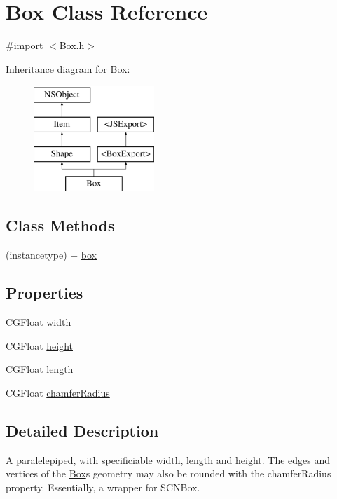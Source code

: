\hypertarget{interface_box}{}\section{Box Class Reference}
\label{interface_box}


{\ttfamily \#import $<$Box.\+h$>$}

Inheritance diagram for Box\+:\begin{figure}[H]
\begin{center}
\leavevmode
\includegraphics[height=4.000000cm]{interface_box}
\end{center}
\end{figure}
\subsection*{Class Methods}
\begin{DoxyCompactItemize}
\item 
(instancetype) + \hyperlink{interface_box_aa58179158dc10ea7967081d61214b681}{box}
\end{DoxyCompactItemize}
\subsection*{Properties}
\begin{DoxyCompactItemize}
\item 
C\+G\+Float \hyperlink{interface_box_afc93a48f771956f78dbd30a81e04d295}{width}
\item 
C\+G\+Float \hyperlink{interface_box_a638a76c342fdc0b592e679d800b6fd06}{height}
\item 
C\+G\+Float \hyperlink{interface_box_a2c7eae6cda0de5f55b0b25fce41d12c5}{length}
\item 
C\+G\+Float \hyperlink{interface_box_a8804e085ce16dbee90cc9fc24abe866b}{chamfer\+Radius}
\end{DoxyCompactItemize}


\subsection{Detailed Description}
A paralelepiped, with specificiable width, length and height. The edges and vertices of the \hyperlink{interface_box}{Box}\textquotesingle{}s geometry may also be rounded with the {\ttfamily chamfer\+Radius} property. Essentially, a wrapper for {\ttfamily S\+C\+N\+Box}. 

